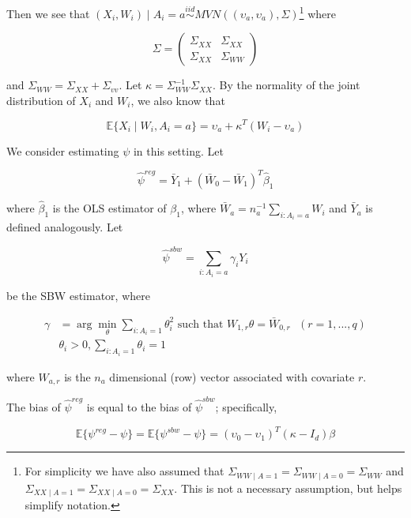 Then we see that $(X_i, W_i) \mid A_i = a \stackrel{iid}{\sim} MVN((\upsilon_a, \upsilon_a), \Sigma)$\footnote{For simplicity we have also assumed that $\Sigma_{WW \mid A = 1} = \Sigma_{WW \mid A = 0} = \Sigma_{WW}$ and $\Sigma_{XX \mid A = 1} = \Sigma_{XX \mid A = 0} = \Sigma_{XX}$. This is not a necessary assumption, but helps simplify notation.} where 

$$
\Sigma = \begin{pmatrix} 
\Sigma_{XX} & \Sigma_{XX} \\ 
\Sigma_{XX} & \Sigma_{WW}  
\end{pmatrix}
$$ 

and $\Sigma_{WW} = \Sigma_{XX} + \Sigma_{vv}$. Let $\kappa = \Sigma_{WW}^{-1}\Sigma_{XX}$. By the normality of the joint distribution of $X_i$ and $W_i$, we also know that

\begin{equation}
\mathbb{E}\{X_i \mid W_i, A_i = a\} = \upsilon_a + \kappa^T(W_i - \upsilon_a)
\end{equation}

We consider estimating $\psi$ in this setting. Let 

$$
\hat{\psi}^{reg} = \bar{Y}_1 + (\bar{W}_0 - \bar{W}_1)^T\hat{\beta}_1
$$ 

where $\hat{\beta}_1$ is the OLS estimator of $\beta_1$, where $\bar{W}_a = n_a^{-1}\sum_{i:A_i = a} W_i$ and $\bar{Y}_a$ is defined analogously. Let 

$$
\hat{\psi}^{sbw} = \sum_{i: A_i = a} \gamma_i Y_i
$$ 

be the SBW estimator, where

\begin{align*}
\gamma &= \arg\min_{\theta} \sum_{i: A_i = 1}\theta_i^2 \text{ such that } W_{1, r}\theta = \bar{W}_{0, r} \ \ \ (r = 1, ..., q) \\
&\theta_i > 0, \sum_{i: A_i = 1}\theta_i = 1
\end{align*}

where $W_{a, r}$ is the $n_a$ dimensional (row) vector associated with covariate $r$.

\begin{proposition}\label{cl1}
The bias of $\hat{\psi}^{reg}$ is equal to the bias of $\hat{\psi}^{sbw}$; specifically, 

$$
\mathbb{E}\{\psi^{reg} - \psi\} = \mathbb{E}\{\psi^{sbw} - \psi\} = (\upsilon_0 - \upsilon_1)^T(\kappa - I_d)\beta
$$
\end{proposition}

